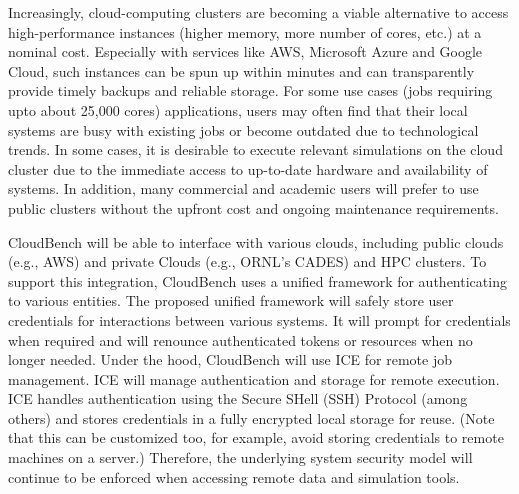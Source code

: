 

Increasingly, cloud-computing clusters are becoming a viable alternative to 
access high-performance instances (higher memory, more number of cores, etc.) at 
a nominal cost. Especially with services like AWS, Microsoft Azure and Google 
Cloud, such instances can be spun up within minutes and can transparently 
provide timely backups and reliable storage. For some use cases (jobs requiring upto about 25,000 cores) applications, users may often 
find that their local systems are busy with existing jobs or become outdated 
due to technological trends. In some cases, it is desirable to execute relevant 
simulations on the cloud cluster due to the immediate access to up-to-date 
hardware and availability of systems. In addition, many commercial and academic users will prefer to use public clusters without the upfront cost and ongoing maintenance requirements.

CloudBench will be able to interface with various clouds, including public clouds (e.g., AWS) and private Clouds (e.g., ORNL's CADES)  and HPC clusters.
To support this integration, CloudBench uses a unified framework for 
authenticating to various entities. The proposed unified framework will safely 
store user credentials for interactions between various systems. It will prompt 
for credentials when required and will renounce authenticated tokens or 
resources when no longer needed.
Under the hood, CloudBench will use ICE for remote job management. ICE will manage authentication and storage for remote execution. ICE handles authentication using the Secure SHell (SSH) Protocol (among others) and stores credentials in a fully encrypted local storage for reuse. (Note that this can be customized too, for example, avoid storing credentials to remote machines on a server.) Therefore, the underlying system security model will continue to be enforced when accessing remote data and simulation tools.

